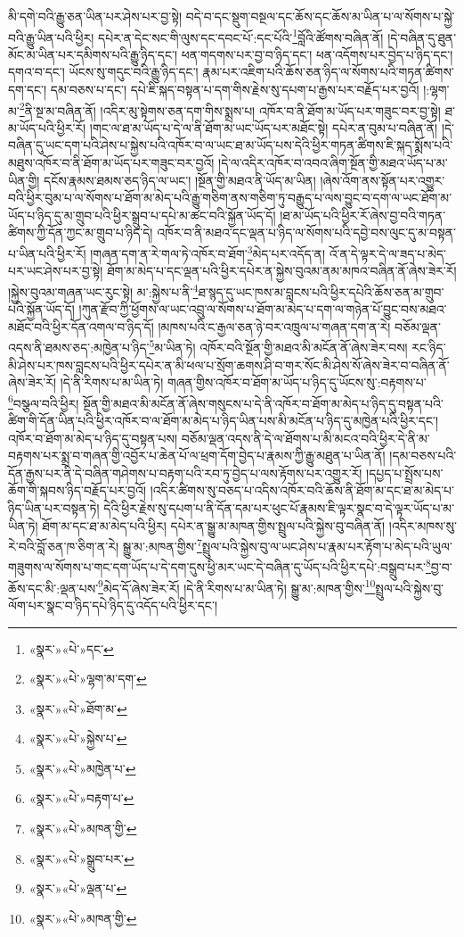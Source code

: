 མི་དགེ་བའི་རྒྱུ་ཅན་ཡིན་པར་ཤེས་པར་བྱ་སྟེ། བདེ་བ་དང་སྡུག་བསྔལ་དང་ཆོས་དང་ཆོས་མ་ཡིན་པ་ལ་སོགས་པ་སྐྱེ་བའི་རྒྱུ་ཡིན་པའི་ཕྱིར། དཔེར་ན་དེང་སང་གི་ལུས་དང་དབང་པོ་:དང་པོའི་\footnote{«སྣར་»«པེ་»དང་}བློའི་ཚོགས་བཞིན་ནོ། །དེ་བཞིན་དུ་ཐུན་མོང་མ་ཡིན་པར་དམིགས་པའི་རྒྱུ་ཉིད་དང་། ཕན་གདགས་པར་བྱ་བ་ཉིད་དང་། ཕན་འདོགས་པར་བྱེད་པ་ཉིད་དང་། དགའ་བ་དང་། ཡོངས་སུ་གདུང་བའི་རྒྱུ་ཉིད་དང་། རྣམ་པར་འཇིག་པའི་ཆོས་ཅན་ཉིད་ལ་སོགས་པའི་གཏན་ཚིགས་དག་དང་། དམ་བཅས་པ་དང་། དཔེ་ཇི་སྐད་བསྟན་པ་དག་གིས་རྗེས་སུ་དཔག་པ་རྒྱས་པར་བརྗོད་པར་བྱའོ། །:ལྷག་མ་\footnote{«སྣར་»«པེ་»ལྷག་མ་དག་}ནི་སྔ་མ་བཞིན་ནོ། །འདིར་མུ་སྟེགས་ཅན་དག་གིས་སྨྲས་པ། འཁོར་བ་ནི་ཐོག་མ་ཡོད་པར་གཟུང་བར་བྱ་སྟེ། ཐ་མ་ཡོད་པའི་ཕྱིར་རོ། །གང་ལ་ཐ་མ་ཡོད་པ་དེ་ལ་ནི་ཐོག་མ་ཡང་ཡོད་པར་མཐོང་སྟེ། དཔེར་ན་བུམ་པ་བཞིན་ནོ། །དེ་བཞིན་དུ་ཡང་དག་པའི་ཤེས་པ་སྐྱེས་པའི་འཁོར་བ་ལ་ཡང་ཐ་མ་ཡོད་པས་དེའི་ཕྱིར་གཏན་ཚིགས་ཇི་སྐད་སྨོས་པའི་མཐུས་འཁོར་བ་ནི་ཐོག་མ་ཡོད་པར་གཟུང་བར་བྱའོ། །དེ་ལ་འདིར་འཁོར་བ་འབའ་ཞིག་སྔོན་གྱི་མཐའ་ཡོད་པ་མ་ཡིན་གྱི། དངོས་རྣམས་ཐམས་ཅད་ཉིད་ལ་ཡང་། །སྔོན་གྱི་མཐའ་ནི་ཡོད་མ་ཡིན། །ཞེས་འོག་ནས་སྟོན་པར་འགྱུར་བའི་ཕྱིར་བུམ་པ་ལ་སོགས་པ་ཐོག་མ་མེད་པའི་རྒྱུ་གཅིག་ནས་གཅིག་ཏུ་བརྒྱུད་པ་ལས་བྱུང་བ་དག་ལ་ཡང་ཐོག་མ་ཡོད་པ་ཉིད་དུ་མ་གྲུབ་པའི་ཕྱིར་སྒྲུབ་པ་དཔེ་མ་ཚང་བའི་སྐྱོན་ཡོད་དོ། །ཐ་མ་ཡོད་པའི་ཕྱིར་རོ་ཞེས་བྱ་བའི་གཏན་ཚིགས་ཀྱི་དོན་ཀྱང་མ་གྲུབ་པ་ཉིད་དེ། འཁོར་བ་ནི་མཐའ་དང་ལྡན་པ་ཉིད་ལ་སོགས་པའི་དབྱེ་བས་ལུང་དུ་མ་བསྟན་པ་ཡིན་པའི་ཕྱིར་རོ། །གཞན་དག་ན་རེ་གལ་ཏེ་འཁོར་བ་ཐོག་\footnote{«སྣར་»«པེ་»ཐོག་མ་}མེད་པར་འདོད་ན། འོ་ན་དེ་ལྟར་དེ་ལ་ཟད་པ་མེད་པར་ཡང་ཤེས་པར་བྱ་སྟེ། ཐོག་མ་མེད་པ་དང་ལྡན་པའི་ཕྱིར་དཔེར་ན་སྐྱེས་བུའམ་ནམ་མཁའ་བཞིན་ནོ་ཞེས་ཟེར་རོ། །སྐྱེས་བུའམ་གཞན་ཡང་རུང་སྟེ། མ་:སྐྱེས་པ་ནི་\footnote{«སྣར་»«པེ་»སྐྱེས་པ་}ཐ་སྙད་དུ་ཡང་ཁས་མ་བླངས་པའི་ཕྱིར་དཔེའི་ཆོས་ཅན་མ་གྲུབ་པའི་སྐྱོན་ཡོད་དོ། །ཀུན་རྫོབ་ཀྱི་ཕྱོགས་ལ་ཡང་འབྲུ་ལ་སོགས་པ་ཐོག་མ་མེད་པ་དག་ལ་གཉེན་པོ་བྱུང་བས་མཐའ་མཐོང་བའི་ཕྱིར་དོན་འགལ་བ་ཉིད་དོ། །མཁས་པའི་ང་རྒྱལ་ཅན་ཉེ་བར་འཁྲུལ་པ་གཞན་དག་ན་རེ། བཅོམ་ལྡན་འདས་ནི་ཐམས་ཅད་:མཁྱེན་པ་ཉིད་\footnote{«སྣར་»«པེ་»མཁྱེན་པ་}མ་ཡིན་ཏེ། འཁོར་བའི་སྔོན་གྱི་མཐའ་མི་མངོན་ནོ་ཞེས་ཟེར་བས། རང་ཉིད་མི་ཤེས་པར་ཁས་བླངས་པའི་ཕྱིར་དཔེར་ན་མི་ཕལ་པ་སྲོག་ཆགས་ཤི་བ་གར་སོང་མི་ཤེས་སོ་ཞེས་ཟེར་བ་བཞིན་ནོ་ཞེས་ཟེར་རོ། །དེ་ནི་རིགས་པ་མ་ཡིན་ཏེ། གཞན་གྱིས་འཁོར་བ་ཐོག་མ་ཡོད་པ་ཉིད་དུ་ཡོངས་སུ་:བརྟགས་པ་\footnote{«སྣར་»«པེ་»བརྟག་པ་}བསྩལ་བའི་ཕྱིར། སྔོན་གྱི་མཐའ་མི་མངོན་ནོ་ཞེས་གསུངས་པ་དེ་ནི་འཁོར་བ་ཐོག་མ་མེད་པ་ཉིད་དུ་བསྟན་པའི་ཚིག་གི་དོན་ཡིན་པའི་ཕྱིར་འཁོར་བ་ལ་ཐོག་མ་མེད་པ་ཉིད་ཡིན་པས་མི་མངོན་པ་ཉིད་དུ་མཁྱེན་པའི་ཕྱིར་དང་། འཁོར་བ་ཐོག་མ་མེད་པ་ཉིད་དུ་བསྟན་པས། བཅོམ་ལྡན་འདས་ནི་དེ་ལ་ཐོགས་པ་མི་མངའ་བའི་ཕྱིར་དེ་ནི་མ་བརྟགས་པར་སྨྲ་བ་གཞན་གྱི་འབྱོར་པ་ཆེན་པོ་ལ་ཕྲག་དོག་བྱེད་པ་རྣམས་ཀྱི་རྒྱུ་མཐུན་པ་ཡིན་ནོ། །དམ་བཅས་པའི་དོན་རྒྱས་པར་ནི་དེ་བཞིན་གཤེགས་པ་བརྟག་པའི་རབ་ཏུ་བྱེད་པ་ལས་རྟོགས་པར་འགྱུར་རོ། །དཔྱད་པ་སྤྲོས་པས་ཆོག་གི་སྐབས་ཉིད་བརྗོད་པར་བྱའོ། །འདིར་ཚིགས་སུ་བཅད་པ་འདིས་འཁོར་བའི་ཆོས་ནི་ཐོག་མ་དང་ཐ་མ་མེད་པ་ཉིད་ཡིན་པར་བསྟན་ཏེ། དེའི་ཕྱིར་རྗེས་སུ་དཔག་པ་ནི་དོན་དམ་པར་ཕུང་པོ་རྣམས་ཇི་ལྟར་སྣང་བ་དེ་ལྟར་ཡོད་པ་མ་ཡིན་ཏེ། ཐོག་མ་དང་ཐ་མ་མེད་པའི་ཕྱིར། དཔེར་ན་སྒྱུ་མ་མཁན་གྱིས་སྤྲུལ་པའི་སྐྱེས་བུ་བཞིན་ནོ། །འདིར་མཁས་སུ་རེ་བའི་བློ་ཅན་ཁ་ཅིག་ན་རེ། སྒྱུ་མ་:མཁན་གྱིས་\footnote{«སྣར་»«པེ་»མཁན་གྱི་}སྤྲུལ་པའི་སྐྱེས་བུ་ལ་ཡང་ཤེས་པ་རྣམ་པར་རྟོག་པ་མེད་པའི་ཡུལ་གཟུགས་ལ་སོགས་པ་གང་དག་ཡོད་པ་དེ་དག་དུས་ཕྱི་མར་ཡང་དེ་བཞིན་དུ་ཡོད་པའི་ཕྱིར་དཔེ་:བསྒྲུབ་པར་\footnote{«སྣར་»«པེ་»སྒྲུབ་པར་}བྱ་བ་ཆོས་དང་མི་:ལྡན་པས་\footnote{«སྣར་»«པེ་»ལྡན་པ་}མེད་དོ་ཞེས་ཟེར་རོ། །དེ་ནི་རིགས་པ་མ་ཡིན་ཏེ། སྒྱུ་མ་:མཁན་གྱིས་\footnote{«སྣར་»«པེ་»མཁན་གྱི་}སྤྲུལ་པའི་སྐྱེས་བུ་ལོག་པར་སྣང་བ་ཉིད་དཔེ་ཉིད་དུ་འདོད་པའི་ཕྱིར་དང་། 